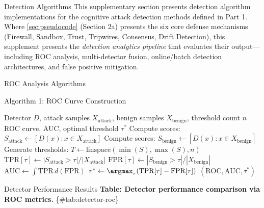 \documentclass[
  ignorenonframetext,
]{beamer}
\author{\texorpdfstring{}{}}
\date{}
\begin{document}
\begin{frame}
\newpage
\end{frame}

\begin{frame}{Detection Algorithms}
\protect{}\label{sec:detection-algorithms}
This supplementary section presents detection algorithm implementations
for the cognitive attack detection methods defined in Part 1. Where
\cref{sec:pseudocode} (Section 2a) presents the six core defense
mechanisms (Firewall, Sandbox, Trust, Tripwires, Consensus, Drift
Detection), this supplement presents the \emph{detection analytics
pipeline} that evaluates their output---including ROC analysis,
multi-detector fusion, online/batch detection architectures, and false
positive mitigation.

\begin{block}{ROC Analysis Algorithms}
\protect{}\label{roc-analysis-algorithms}
\begin{block}{Algorithm 1: ROC Curve Construction}
\protect{}\label{algorithm-1-roc-curve-construction}
\begin{algorithm}
\caption{ROC Curve Construction}
\label{alg:roc-construction}
\begin{algorithmic}[1]
\Require Detector $D$, attack samples $X_{\text{attack}}$, benign samples $X_{\text{benign}}$, threshold count $n$
\Ensure ROC curve, AUC, optimal threshold $\tau^*$
\State Compute scores: $S_{\text{attack}} \gets [D(x) : x \in X_{\text{attack}}]$
\State Compute scores: $S_{\text{benign}} \gets [D(x) : x \in X_{\text{benign}}]$
\State Generate thresholds: $T \gets \text{linspace}(\min(S), \max(S), n)$
    \State $\text{TPR}[\tau] \gets |S_{\text{attack}} > \tau| / |X_{\text{attack}}|$
    \State $\text{FPR}[\tau] \gets |S_{\text{benign}} > \tau| / |X_{\text{benign}}|$
\EndFor
\State $\text{AUC} \gets \int \text{TPR} \, d(\text{FPR})$ 
\State $\tau^* \gets \argmax_\tau (\text{TPR}[\tau] - \text{FPR}[\tau])$ 
\State \Return $(\text{ROC}, \text{AUC}, \tau^*)$
\end{algorithmic}
\end{algorithm}
\end{block}
\end{block}

\begin{block}{Detector Performance Results}
\protect{}\label{detector-performance-results}
\textbf{Table: Detector performance comparison via ROC metrics.}
\{\#tab:detector-roc\}


\end{block}
\end{frame}
\end{document}
